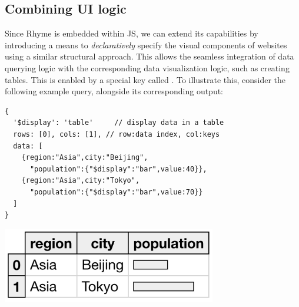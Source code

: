 \documentclass[runningheads]{llncs}
\newcommand{\lang}{Rhyme}
\begin{document}


\subsection{Combining UI logic}
Since \lang{} is embedded within JS, we can extend its capabilities by introducing
a means to \emph{declaratively} specify the visual components of websites using a similar
structural approach.
This allows the seamless integration of data querying logic with the corresponding
data visualization logic, such as creating tables.
This is enabled by a special key called .
To illustrate this, consider the following example query, alongside its corresponding output:

\hspace{-18pt}
\begin{minipage}{0.6\textwidth}
\begin{lstlisting}[style=JavaScript,columns=flexible]
{
  '$display': 'table'     // display data in a table
  rows: [0], cols: [1], // row:data index, col:keys
  data: [
    {region:"Asia",city:"Beijing",
      "population":{"$display":"bar",value:40}},
    {region:"Asia",city:"Tokyo",
      "population":{"$display":"bar",value:70}}
  ]
}
\end{lstlisting}
\end{minipage}%
\begin{minipage}{0.4\textwidth}
\includegraphics[width=0.7\textwidth]{images/small_table.png}
\end{minipage}
\end{document}
